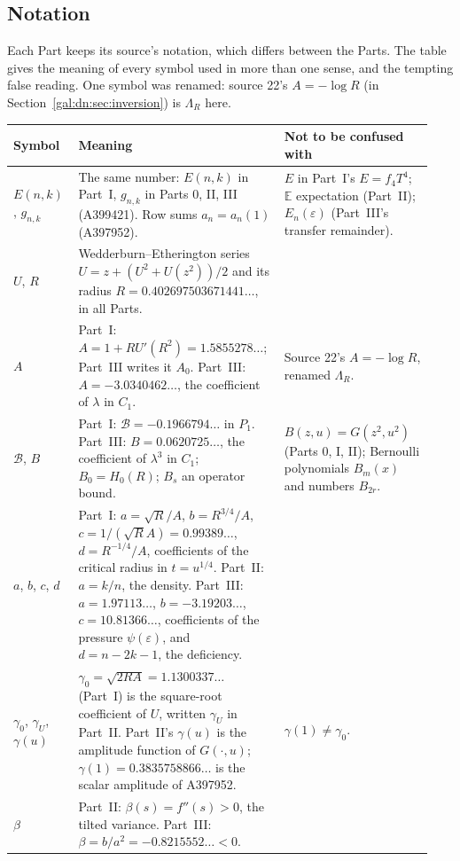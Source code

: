 \documentclass[11pt,letterpaper]{article}
\numberwithin{equation}{section}
\theoremstyle{definition}\newtheorem{definition}[theorem]{Definition}
\theoremstyle{remark}\newtheorem{remark}[theorem]{Remark}
\newcommand{\eps}{\varepsilon}
\newcommand{\E}{\mathbb E}
\begin{document}
\subsection*{Notation}
\label{gal:guide:notation}
Each Part keeps its source's notation, which differs between the Parts. The table gives the meaning of every symbol used in more than one sense, and the tempting false reading. One symbol was renamed: source 22's $A=-\log R$ (in Section~\ref{gal:dn:sec:inversion}) is $\Lambda_R$ here.
{\small
\begin{longtable}{@{}>{\raggedright\arraybackslash}p{0.13\linewidth}>{\raggedright\arraybackslash}p{0.47\linewidth}>{\raggedright\arraybackslash}p{0.34\linewidth}@{}}
\toprule
Symbol & Meaning & Not to be confused with\\
\midrule
\endhead
\bottomrule
\endfoot
$E(n,k)$, $g_{n,k}$ & The same number: $E(n,k)$ in Part~I, $g_{n,k}$ in Parts 0, II, III (A399421). Row sums $a_n=a_n(1)$ (A397952). & $E$ in Part~I's $E=f_4T^4$; $\E$ expectation (Part~II); $E_n(\eps)$ (Part~III's transfer remainder).\\
$U$, $R$ & Wedderburn--Etherington series $U=z+(U^2+U(z^2))/2$ and its radius $R=0.402697503671441\ldots$, in all Parts. & \\
$A$ & Part~I: $A=1+RU'(R^2)=1.5855278\ldots$; Part~III writes it $A_0$. Part~III: $A=-3.0340462\ldots$, the coefficient of $\lambda$ in $C_1$. & Source 22's $A=-\log R$, renamed $\Lambda_R$.\\
$\mathcal B$, $B$ & Part~I: $\mathcal B=-0.1966794\ldots$ in $P_1$. Part~III: $B=0.0620725\ldots$, the coefficient of $\lambda^3$ in $C_1$; $B_0=H_0(R)$; $B_s$ an operator bound. & $B(z,u)=G(z^2,u^2)$ (Parts 0, I, II); Bernoulli polynomials $B_m(x)$ and numbers $B_{2r}$.\\
$a$, $b$, $c$, $d$ & Part~I: $a=\sqrt R/A$, $b=R^{3/4}/A$, $c=1/(\sqrt RA)=0.99389\ldots$, $d=R^{-1/4}/A$, coefficients of the critical radius in $t=u^{1/4}$. Part~II: $a=k/n$, the density. Part~III: $a=1.97113\ldots$, $b=-3.19203\ldots$, $c=10.81366\ldots$, coefficients of the pressure $\psi(\eps)$, and $d=n-2k-1$, the deficiency. & \\
$\gamma_0$, $\gamma_U$, $\gamma(u)$ & $\gamma_0=\sqrt{2RA}=1.1300337\ldots$ (Part~I) is the square-root coefficient of $U$, written $\gamma_U$ in Part~II. Part~II's $\gamma(u)$ is the amplitude function of $G(\cdot,u)$; $\gamma(1)=0.3835758866\ldots$ is the scalar amplitude of A397952. & $\gamma(1)\neq\gamma_0$.\\
$\beta$ & Part~II: $\beta(s)=f''(s)>0$, the tilted variance. Part~III: $\beta=b/a^2=-0.8215552\ldots<0$. & \\

\end{longtable}}
\end{document}
